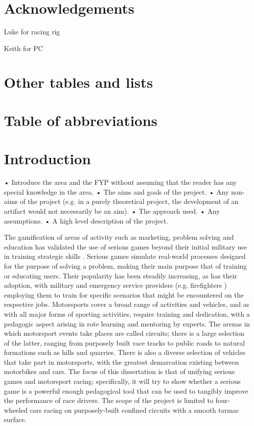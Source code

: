 \documentclass{article}
\begin{document}
\newpage
\section{Acknowledgements}

Luke for racing rig

Keith for PC

\newpage
\tableofcontents

\newpage
\section{Other tables and lists}
\listoffigures

\newpage
\section{Table of abbreviations}

\newpage
\section{Introduction}

• Introduce the area and the FYP without assuming that the reader has any special knowledge in the area.
• The aims and goals of the project.
• Any non-aims of the project (e.g. in a purely theoretical project, the development of an artifact would not necessarily be an aim).
• The approach used.
• Any assumptions.
• A high level description of the project.

The gamification of areas of activity such as marketing, problem solving and education \cite{michael2005serious} has validated the use of serious games beyond their initial military use in training strategic skills \cite{djaouti2011classifying}.  Serious games simulate real-world processes designed for the purpose of solving a problem, making their main purpose that of training or educating users. Their popularity has been steadily increasing, as has their adoption, with military \cite{djaouti2011classifying} and emergency service providers (e.g. firefighters \cite{michael2005serious}) employing them to train for specific scenarios that might be encountered on the respective jobs. Motorsports cover a broad range of activities and vehicles, and as with all major forms of sporting activities, require training and dedication, with a pedagogic aspect arising in rote learning and mentoring by experts. The arenas in which motorsport events take places are called circuits; there is a large selection of the latter, ranging from purposely built race tracks to public roads to natural formations such as hills and quarries. There is also a diverse selection of vehicles that take part in motorsports, with the greatest demarcation existing between motorbikes and cars. The focus of this dissertation is that of unifying serious games and motorsport racing; specifically, it will try to show whether a serious game is a powerful enough pedagogical tool that can be used to tangibly improve the performance of race drivers. The scope of the project is limited to four-wheeled cars racing on purposely-built confined circuits with a smooth tarmac surface.  
\end{document}
